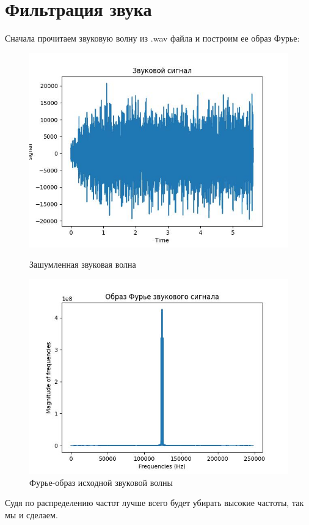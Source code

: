       \section{Фильтрация звука}
      Сначала прочитаем звуковую волну из .wav файла и построим 
      ее образ Фурье:
      \begin{figure}[!htb]
          \includegraphics[width=\linewidth]{../images/result/sound_wave.jpeg}
          \caption{Зашумленная звуковая волна}
        \endminipage\hfill
          \includegraphics[width=\linewidth]{../images/result/soundwave_fourier.jpeg}
          \caption{Фурье-образ исходной звуковой волны}
        \endminipage\hfill
        \end{figure}
        \noindent Судя по распределению частот  лучше всего будет убирать высокие частоты, так мы и сделаем.
        
